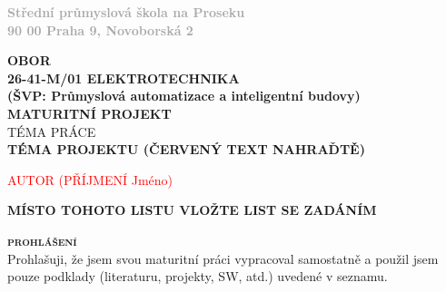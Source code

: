 \documentclass[12pt,a4paper]{article} %
\begin{document}
\begin{titlepage}
\begin{minipage}{0.20\textwidth}
\end{minipage}
\begin{adjustbox}{minipage=0.6\textwidth,left}
	\textbf{\textcolor{darkgray}{
	Střední průmyslová škola na Proseku\\
	90 00 Praha 9, Novoborská 2}}
\end{adjustbox}\\[1cm]

\center

\textbf{\large OBOR}\\[0.5cm]
\textbf{\large	26-41-M/01 ELEKTROTECHNIKA\\
				(ŠVP: Průmyslová automatizace a inteligentní budovy)}\\[1cm]
\textbf{\LARGE MATURITNÍ PROJEKT}\\[1.5cm]
\textsc{TÉMA PRÁCE}\\[1.5cm]
\textbf{\color{red} \huge \bfseries  TÉMA PROJEKTU (ČERVENÝ TEXT NAHRAĎTĚ)}

\vspace*{\fill}

\begin{minipage}{0.49\textwidth}
\begin{flushleft} \large
\the\year %
\end{flushleft}
\end{minipage}
\begin{minipage}{0.49\textwidth}
\begin{flushright}
\textcolor{red}{\large AUTOR (PŘÍJMENÍ Jméno)}
\end{flushright}
\end{minipage}

\end{titlepage}

\textbf{\color{red} \LARGE MÍSTO TOHOTO LISTU VLOŽTE LIST SE ZADÁNÍM}
\newpage

\textsc{\textbf{\fontsize{20pt}{0}\selectfont prohlášení}}\\

{Prohlašuji, že jsem svou maturitní práci vypracoval samostatně a použil jsem pouze podklady (literaturu, projekty, SW, atd.) uvedené v seznamu.
}\\
\end{document}
